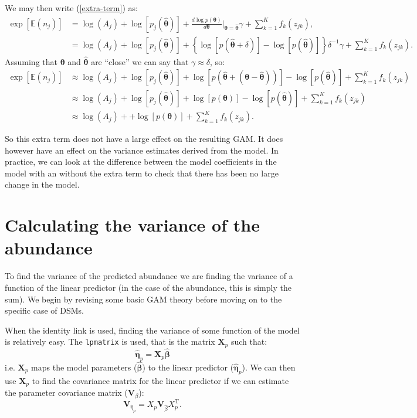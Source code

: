 \documentclass[11pt]{amsart}
\begin{document}
We may then write (\ref{extra-term}) as:
\begin{align*}
\exp\left[ \mathbb{E}(n_j) \right] &= \log\left(A_j\right) + \log\left[p_j(\bm{\hat{\theta}})\right] + \frac{ d \log p(\bm{\theta})}{d\bm{\theta}} \Big\vert_{\bm{\theta} = \hat{\bm{\theta}}} \gamma + \sum_{k=1}^K f_k(z_{jk}),\\
&= \log\left(A_j\right) + \log\left[p_j(\bm{\hat{\theta}})\right] + \left\{\log\left[p(\hat{\bm{\theta}} + \delta)\right] - \log\left[p(\hat{\bm{\theta}})\right]\right\}\delta^{-1} \gamma + \sum_{k=1}^K f_k(z_{jk}).
\end{align*}
Assuming that $\bm{\theta}$ and $\bm{\hat{\theta}}$ are ``close'' we can say that $\gamma \approx \delta$, so:
\begin{align*}
\exp\left[ \mathbb{E}(n_j) \right] &\approx \log\left(A_j\right) + \log\left[p_j(\bm{\hat{\theta}})\right] + \log\left[p(\hat{\bm{\theta}} + (\bm{\theta} - \bm{\hat{\theta}}))\right] - \log\left[p(\hat{\bm{\theta}})\right] + \sum_{k=1}^K f_k(z_{jk})\\
&\approx \log\left(A_j\right) + \log\left[p_j(\bm{\hat{\theta}})\right] + \log\left[p(\bm{\theta})\right] - \log\left[p(\hat{\bm{\theta}})\right] + \sum_{k=1}^K f_k(z_{jk})\\
&\approx \log\left(A_j\right) + + \log\left[p(\bm{\theta})\right] + \sum_{k=1}^K f_k(z_{jk}).
\end{align*}

So this extra term does not have a large effect on the resulting GAM. It does however have an effect on the variance estimates derived from the model. In practice, we can look at the difference between the model coefficients in the model with an without the extra term to check that there has been no large change in the model.

\section{Calculating the variance of the abundance}

To find the variance of the predicted abundance we are finding the variance of a function of the linear predictor (in the case of the abundance, this is simply the sum). We begin by revising some basic GAM theory before moving on to the specific case of DSMs. 

When the identity link is used, finding the variance of some function of the model is relatively easy. The \texttt{lpmatrix} \citep[][page 245]{Wood:2006wz} is used, that is the matrix $\bm{X}_{p}$ such that:
$$
\hat{\bm{\eta}}_p = \bm{X}_{p} \hat{\bm{\beta}}
$$
i.e. $\bm{X}_{p}$ maps the model parameters ($\hat{\bm{\beta}}$) to the linear predictor ($\hat{\bm{\eta}}_p$). We can then use $\bm{X}_{p}$ to find the covariance matrix for the linear predictor if we can estimate the parameter covariance matrix ($\bm{V}_{\beta}$):
$$
\bm{V}_{\hat{\eta}_p} = X_p \bm{V}_{\hat{\beta}} X_p^\text{T}.
$$
\end{document}
